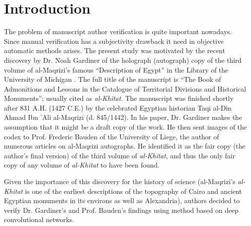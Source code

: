 \documentclass[conference,a4paper,twocolumn]{IEEEtran}
\begin{document}

%
\IEEEpeerreviewmaketitle


\section{Introduction}
\label{sec:introduction}
The problem of manuscript author verification is quite important nowadays. Since manual verification has a subjectivity drawback it need in objective automatic methods arises. The present study was motivated by the recent discovery by Dr. Noah Gardiner of the holograph (autograph) copy of the third volume of al-Maqrizi's famous ``Description of Egypt'' in the Library of the University of Michigan \cite{Noah}. The full title of the manuscript is ``The Book of Admonitions and Lessons in the Catalogue of Territorial Divisions and Historical Monuments''; usually cited as \textit{al-Khitat}. The manuscript was finished shortly after 831 A.H. (1427 C.E.) by the celebrated Egyptian historian Taqi al-Din Ahmad Ibn 'Ali al-Maqrizi (d. 845/1442). In his paper, Dr. Gardiner makes the assumption that it might be a draft copy of the work. He then sent images of the codex to Prof. Frederic Bauden of the University of Liege, the author of numerous articles on al-Maqrizi autographs. He identified it as the fair copy (the author's final version) of the third volume of \textit{al-Khitat}, and thus the only fair copy of any volume of \textit{al-Khitat} to have been found.

Given the importance of this discovery for the history of science (al-Maqrizi's \textit{al-Khitat} is one of the earliest descriptions of the topography of Cairo and ancient Egyptian monuments in its environs as well as Alexandria), authors decided to verify Dr. Gardiner's and Prof. Bauden's findings using method based on deep convolutional networks.
\end{document}
